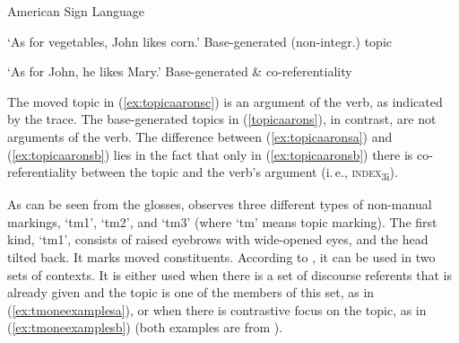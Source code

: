 \begin{exe}
\ex American Sign Language \label{topicaarons}\begin{xlist} 
\ex {} 
%
\glt `As for vegetables, John likes corn.' \label{ex:topicaaronsa} \hfill Base-generated (non-integr.) topic

\ex \ex {} 
\glt `As for John, he likes Mary.' \label{ex:topicaaronsb} \hfill Base-generated \& co-referentiality
\end{xlist}
\end{exe} 

\noindent The moved topic in (\ref{ex:topicaaronsc}) is an argument of the verb, as indicated by the trace. The base-generated topics in (\ref{topicaarons}), in contrast, are not arguments of the verb. The difference between (\ref{ex:topicaaronsa}) and (\ref{ex:topicaaronsb}) lies in the fact that only in (\ref{ex:topicaaronsb}) there is co-referentiality between the topic and the verb's argument (i.\,e., \textsc{index}\textsubscript{3i}). 

As can be seen from the glosses, \citet{aarons1996topics} observes three different types of non-manual markings, `tm1', `tm2', and `tm3' (where `tm' means topic marking). The first kind, `tm1', consists of raised eyebrows with wide-opened eyes, and the head tilted back. It marks moved constituents. According to \citet{aarons1996topics}, it can be used in two sets of contexts. It is either used when there is a set of discourse referents that is already given and the topic is one of the members of this set, as in (\ref{ex:tmoneexamplesa}), or  when there is contrastive focus on the topic, as in (\ref{ex:tmoneexamplesb}) (both examples are from \citealt[76]{aarons1996topics}).

